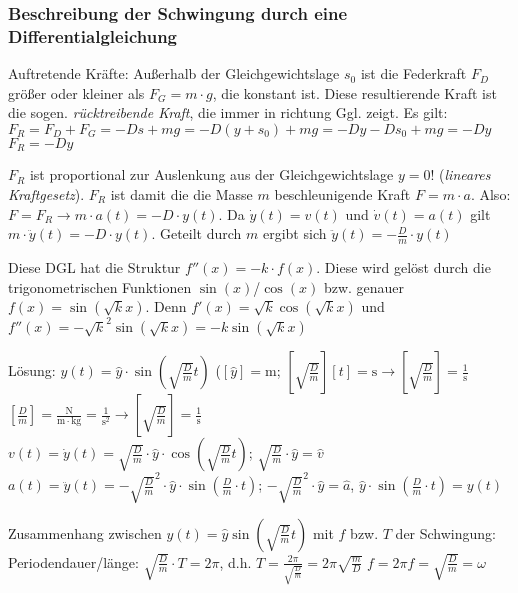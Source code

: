 \documentclass[a4paper]{scrartcl}
\begin{document}
\subsubsection{Beschreibung der Schwingung durch eine Differentialgleichung}
Auftretende Kräfte: Außerhalb der Gleichgewichtslage $s_0$ ist die Federkraft
$F_D$ größer oder kleiner als $F_G = m \cdot g$, die konstant ist. Diese
resultierende Kraft ist die sogen. \emph{rücktreibende Kraft}, die immer in
richtung Ggl. zeigt. Es gilt: $F_R = F_D + F_G = -Ds + mg = -D(y+s_0) + mg =
-Dy-Ds_0 + mg = -Dy$ $F_R = -Dy$ %

$F_R$ ist proportional zur Auslenkung aus der Gleichgewichtslage $y=0$!
(\emph{lineares Kraftgesetz}).
$F_R$ ist damit die die Masse $m$ beschleunigende Kraft $F=m \cdot a$. Also: $F
= F_R \rightarrow m \cdot a(t) = -D \cdot y(t)$. Da $\dot{y}(t) = v(t)$ und
$\dot{v}(t) = a(t)$ gilt $m \cdot \ddot{y}(t) = -D \cdot y(t)$. Geteilt durch
$m$ ergibt sich $\ddot{y}(t) = -\frac{D}{m} \cdot y(t)$

Diese DGL hat die Struktur $f''(x) = -k \cdot f(x)$. Diese wird gelöst durch
die trigonometrischen Funktionen $\sin(x)$/$\cos(x)$ bzw. genauer $f(x) =
\sin(\sqrt{k}x)$. Denn $f'(x) = \sqrt{k} \cos(\sqrt{k}x)$ und $f''(x) =
-\sqrt{k}^2 \sin(\sqrt{k}x) = -k \sin(\sqrt{k}x)$

Lösung: $y(t) = \hat{y} \cdot \sin(\sqrt{\frac{D}{m}}t)$ ($[\hat{y}] =
\mathrm{m}$; $[\sqrt{\frac{D}{m}}][t] = \mathrm{s} \rightarrow
[\sqrt{\frac{D}{m}}] = \frac{1}{\mathrm{s}}$
\\
$[\frac{D}{m}] = \frac{\mathrm{N}}{\mathrm{m \cdot kg}} =
\frac{1}{\mathrm{s^2}} \rightarrow [\sqrt{\frac{D}{m}}] = \frac{1}{\mathrm{s}}$
\\
$v(t) = \dot{y}(t) = \sqrt{\frac{D}{m}} \cdot \hat{y} \cdot
\cos(\sqrt{\frac{D}{m}}t)$; $\sqrt{\frac{D}{m}} \cdot \hat{y} = \hat{v}$
\\
$a(t) = \ddot{y}(t) = -\sqrt{\frac{D}{m}}^2 \cdot \hat{y} \cdot
\sin(\frac{D}{m} \cdot t)$; $-\sqrt{\frac{D}{m}}^2 \cdot \hat{y} = \hat{a}$,
$\hat{y} \cdot \sin(\frac{D}{m} \cdot t) = y(t)$

Zusammenhang zwischen $y(t) = \hat{y} \sin(\sqrt{\frac{D}{m}} t)$ mit $f$ bzw.
$T$ der Schwingung: Periodendauer/länge: $\sqrt{\frac{D}{m}} \cdot T = 2 \pi$,
d.h. $T=\frac{2 \pi}{\sqrt{\frac{D}{m}}} = 2 \pi \sqrt{\frac{m}{D}}$ $f=2 \pi f
= \sqrt{\frac{D}{m}} = \omega$
\end{document}
